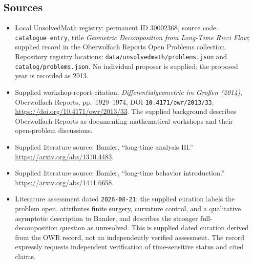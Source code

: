 \documentclass[11pt]{article}
\begin{document}
\subsection{Sources}
\begin{itemize}
\item Local UnsolvedMath registry: permanent ID \(30002368\), source code \texttt{catalogue entry}, title \emph{Geometric Decomposition from Long-Time Ricci Flow}; supplied record in the Oberwolfach Reports Open Problems collection. Repository registry locations: \texttt{data/unsolvedmath/problems.json} and \texttt{catalog/problems.json}. No individual proposer is supplied; the proposed year is recorded as 2013.
\item Supplied workshop-report citation: \emph{Differentialgeometrie im Großen (2014)}, Oberwolfach Reports, pp.\ 1929--1974, DOI \texttt{10.4171/owr/2013/33}. \url{https://doi.org/10.4171/owr/2013/33}. The supplied background describes Oberwolfach Reports as documenting mathematical workshops and their open-problem discussions.
\item Supplied literature source: Bamler, ``long-time analysis III.'' \url{https://arxiv.org/abs/1310.4483}.
\item Supplied literature source: Bamler, ``long-time behavior introduction.'' \url{https://arxiv.org/abs/1411.6658}.
\item Literature assessment dated \texttt{2026-08-21}: the supplied curation labels the problem open, attributes finite surgery, curvature control, and a qualitative asymptotic description to Bamler, and describes the stronger full-decomposition question as unresolved. This is supplied dated curation derived from the OWR record, not an independently verified assessment. The record expressly requests independent verification of time-sensitive status and cited claims.
\end{itemize}
\end{document}

